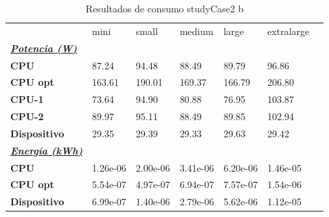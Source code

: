 \begin{table}[H]
    \centering
    \begin{tabular}{lllllll}
    \rowcolor[HTML]{DAE8FC} \ & mini & small & medium & 	large & 	extralarge \\
    \cellcolor[HTML]{DAE8FC} \textbf{\textbf{{\emph{{\underline{{Potencia (W)}}}}}}} &  &  &  & 	 & 	 \\
    \rowcolor[HTML]{EFEFEF} \cellcolor[HTML]{DAE8FC} \textbf{CPU} & 87.24 & 94.48 & 88.49 & 	89.79 & 	96.86 \\
    \cellcolor[HTML]{DAE8FC} \textbf{CPU opt} & 163.61 & 190.01 & 169.37 & 	166.79 & 	206.80 \\
    \rowcolor[HTML]{EFEFEF} \cellcolor[HTML]{DAE8FC} \textbf{\quad CPU-1} & 73.64 & 94.90 & 80.88 & 	76.95 & 	103.87 \\
    \cellcolor[HTML]{DAE8FC} \textbf{\quad CPU-2} & 89.97 & 95.11 & 88.49 & 	89.85 & 	102.94 \\
    \rowcolor[HTML]{EFEFEF} \cellcolor[HTML]{DAE8FC} \textbf{Dispositivo} & 29.35 & 29.39 & 29.33 & 	29.63 & 	29.42 \\
    \cellcolor[HTML]{DAE8FC} \textbf{\textbf{{\emph{{\underline{{Energía (kWh)}}}}}}} &  &  &  & 	 & 	 \\
    \rowcolor[HTML]{EFEFEF} \cellcolor[HTML]{DAE8FC} \textbf{CPU} & 1.26e-06 & 2.00e-06 & 3.41e-06 & 	6.20e-06 & 	1.46e-05 \\
    \cellcolor[HTML]{DAE8FC} \textbf{CPU opt} & 5.54e-07 & 4.97e-07 & 6.94e-07 & 	7.57e-07 & 	1.54e-06 \\
    \rowcolor[HTML]{EFEFEF} \cellcolor[HTML]{DAE8FC} \textbf{Dispositivo} & 6.99e-07 & 1.40e-06 & 2.79e-06 & 	5.62e-06 & 	1.12e-05 \\
    \end{tabular}
    \caption[Resultados de consumo studyCase2 b]{{Resultados de consumo studyCase2 b}}
    \label{table_test_studyCase2_b_hw_powerResults}
\end{table}